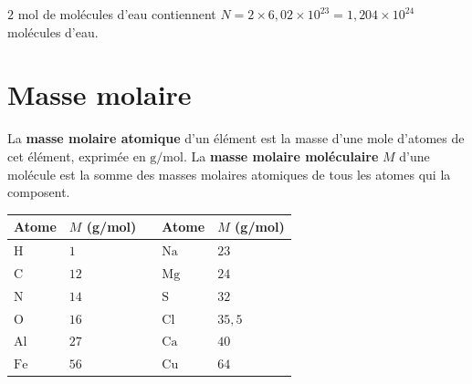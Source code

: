 \begin{illus}
\end{illus}

\begin{exemple}
$2$ mol de molécules d'eau contiennent $N=2\times6{,}02\times10^{23}=1{,}204\times10^{24}$
molécules d'eau.
\end{exemple}

\section{Masse molaire}

\begin{definition}
La \textbf{masse molaire atomique} d'un élément est la masse d'une mole d'atomes de cet
élément, exprimée en $\mathrm{g/mol}$. La \textbf{masse molaire moléculaire} $M$ d'une
molécule est la somme des masses molaires atomiques de tous les atomes qui la composent.
\end{definition}

\begin{center}
\small
\begin{tabular}{llcll}
\toprule
Atome & $M$ (g/mol) & \quad & Atome & $M$ (g/mol) \\
\midrule
$\mathrm{H}$ & $1$ & & $\mathrm{Na}$ & $23$ \\
$\mathrm{C}$ & $12$ & & $\mathrm{Mg}$ & $24$ \\
$\mathrm{N}$ & $14$ & & $\mathrm{S}$ & $32$ \\
$\mathrm{O}$ & $16$ & & $\mathrm{Cl}$ & $35{,}5$ \\
$\mathrm{Al}$ & $27$ & & $\mathrm{Ca}$ & $40$ \\
$\mathrm{Fe}$ & $56$ & & $\mathrm{Cu}$ & $64$ \\
\bottomrule
\end{tabular}
\end{center}

